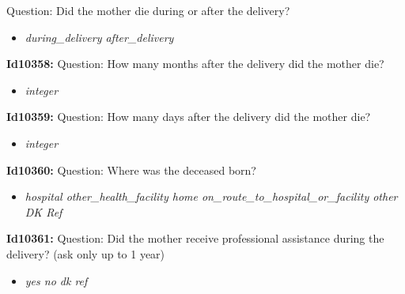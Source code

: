 \documentclass{article}%
\begin{document}
Question: Did the mother die during or after the delivery?\newline%
%
\begin{itemize}%
\item%
\textit{during\_delivery\newline%
 after\_delivery\newline%
}%
\end{itemize}%
\textbf{Id10358: \newline%
}%
Question: How many months after the delivery did the mother die?\newline%
%
\begin{itemize}%
\item%
\textit{integer\newline%
}%
\end{itemize}%
\textbf{Id10359: \newline%
}%
Question: How many days after the delivery did the mother die?\newline%
%
\begin{itemize}%
\item%
\textit{integer\newline%
}%
\end{itemize}%
\textbf{Id10360: \newline%
}%
Question: Where was the deceased born?\newline%
%
\begin{itemize}%
\item%
\textit{hospital\newline%
 other\_health\_facility\newline%
 home\newline%
 on\_route\_to\_hospital\_or\_facility\newline%
 other\newline%
 DK\newline%
 Ref\newline%
}%
\end{itemize}%
\textbf{Id10361: \newline%
}%
Question: Did the mother receive professional assistance during the delivery? (ask only up to 1 year)\newline%
%
\begin{itemize}%
\item%
\textit{yes\newline%
 no\newline%
 dk\newline%
 ref\newline%
}%
\end{itemize}%
\end{document}
